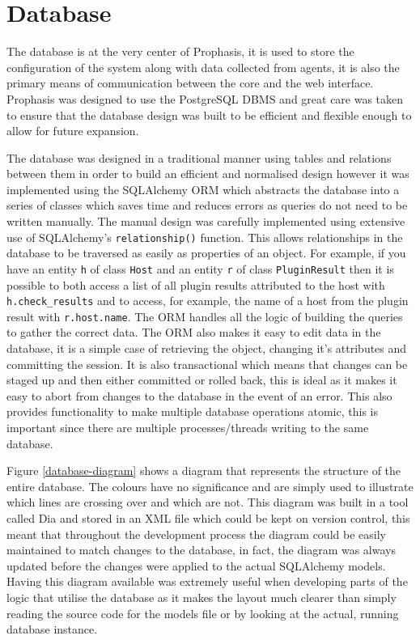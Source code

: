 \documentclass[bsc,deptreport,twoside,parskip,singlespacing,notimes]{infthesis}
\begin{document}
\section{Database}

	The database is at the very center of Prophasis, it is used to store the
	configuration of the system along with data collected from agents, it is also
	the primary means of communication between the core and the web interface.
	Prophasis was designed to use the PostgreSQL DBMS and great care was taken to
	ensure that the database design was built to be efficient and flexible enough
	to allow for future expansion.


	The database was designed in a traditional manner using tables and relations
	between them in order to build an efficient and normalised design however it
	was implemented using the SQLAlchemy ORM which abstracts the database into a
	series of classes which saves time and reduces errors as queries do not need
	to be written manually.  The manual design was carefully implemented using
	extensive use of SQLAlchemy's \texttt{relationship()} function.  This allows
	relationships in the database to be traversed as easily as properties of an
	object.  For example, if you have an entity \texttt{h} of class \texttt{Host}
	and an entity \texttt{r} of class \texttt{PluginResult} then it is possible
	to both access a list of all plugin results attributed to the host with
	\texttt{h.check\_results} and to access, for example, the name of a host
	from the plugin result with \texttt{r.host.name}.  The ORM handles all the
	logic of building the queries to gather the correct data.  The ORM also makes
	it easy to edit data in the database, it is a simple case of retrieving the
	object, changing it's attributes and committing the session.  It is also
	transactional which means that changes can be staged up and then either
	committed or rolled back, this is ideal as it makes it easy to abort from
	changes to the database in the event of an error.  This also provides
	functionality to make multiple database operations atomic, this is important
	since there are multiple processes/threads writing to the same database.


	Figure \ref{database-diagram} shows a diagram that represents the structure
	of the entire database.  The colours have no significance and are simply used
	to illustrate which lines are crossing over and which are not.
	This diagram was built in a tool called Dia and stored
	in an XML file which could be kept on version control, this meant that
	throughout the development process the diagram could be easily maintained to
	match changes to the database, in fact, the diagram was always updated before
	the changes were applied to the actual SQLAlchemy models. Having this diagram
	available was extremely useful when developing parts of the logic that utilise
	the database as it makes the layout much clearer than simply reading the source
	code for the models file or by looking at the actual, running database
	instance.
\end{document}
